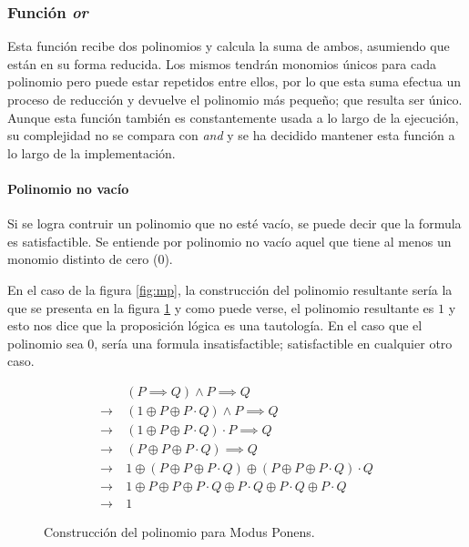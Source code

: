 \subsubsection{Función \textit{or}}

Esta función recibe dos polinomios y calcula la suma de ambos, asumiendo que están en su forma reducida. Los mismos tendrán monomios únicos para cada polinomio pero puede estar repetidos entre ellos, por lo que esta suma efectua un proceso de reducción y devuelve el polinomio más pequeño; que resulta ser único. Aunque esta función también es constantemente usada a lo largo de la ejecución, su complejidad no se compara con \textit{and} y se ha decidido mantener esta función a lo largo de la implementación.

\paragraph{Polinomio no vacío}

Si se logra contruir un polinomio que no esté vacío, se puede decir que la formula es satisfactible. Se entiende por polinomio no vacío aquel que tiene al menos un monomio distinto de cero ($0$).

En el caso de la figura \ref{fig:mp}, la construcción del polinomio resultante sería la que se presenta en la figura \ref{fig:mp_anf} y como puede verse, el polinomio resultante es $1$ y esto nos dice que la proposición lógica es una tautología. En el caso que el polinomio sea $0$, sería una formula insatisfactible; satisfactible en cualquier otro caso.

\begin{figure}
\begin{align*}
                 & (P\implies Q)\land P \implies Q\\
    \rightarrow\ & (1 \oplus P \oplus P\cdot Q)\land P \implies Q\\
    \rightarrow\ & (1 \oplus P \oplus P\cdot Q)\cdot P \implies Q\\
    \rightarrow\ & (P \oplus P \oplus P\cdot Q) \implies Q\\
    \rightarrow\ & 1 \oplus (P \oplus P \oplus P\cdot Q) \oplus (P \oplus P \oplus P\cdot Q)\cdot Q\\
    \rightarrow\ & 1 \oplus P \oplus P \oplus P\cdot Q \oplus P\cdot Q\oplus P\cdot Q \oplus P\cdot Q \\
    \rightarrow\ & 1
\end{align*}
\caption{Construcción del polinomio para Modus Ponens.}
\label{fig:mp_anf}
\end{figure}

